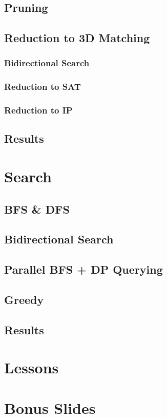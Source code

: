 \documentclass[t,10pt,
mathserif,xcolor=dvipsnames]{beamer}
\begin{document}
\subsection{Pruning}

\subsection{Reduction to 3D Matching}

\subsubsection{Bidirectional Search}

\subsubsection{Reduction to SAT}

\subsubsection{Reduction to IP}

\subsection{Results}

\section{Search}

\subsection{BFS \& DFS}

\subsection{Bidirectional Search}

\subsection{Parallel BFS + DP Querying}

\subsection{Greedy}

\subsection{Results}

\section{Lessons}



\section{Bonus Slides}
 
\end{document}
